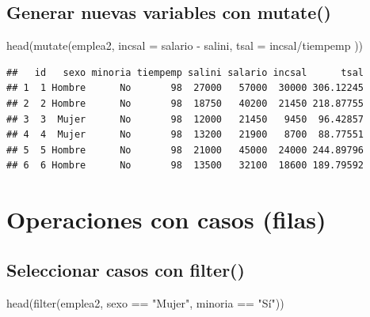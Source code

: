 \documentclass[
]{book}
\newenvironment{Shaded}{\begin{snugshade}}{\end{snugshade}}
\newcommand{\AttributeTok}[1]{\textcolor[rgb]{0.77,0.63,0.00}{#1}}
\newcommand{\FunctionTok}[1]{\textcolor[rgb]{0.00,0.00,0.00}{#1}}
\newcommand{\NormalTok}[1]{#1}
\newcommand{\SpecialCharTok}[1]{\textcolor[rgb]{0.00,0.00,0.00}{#1}}
\newcommand{\StringTok}[1]{\textcolor[rgb]{0.31,0.60,0.02}{#1}}
\theoremstyle{break}
\theoremstyle{nonumberplain}
\begin{document}
\hypertarget{generar-nuevas-variables-con-mutate}{%
\subsection{\texorpdfstring{Generar nuevas variables con \textbf{mutate()}}{Generar nuevas variables con mutate()}}\label{generar-nuevas-variables-con-mutate}}

\begin{Shaded}
\begin{Highlighting}[]
\FunctionTok{head}\NormalTok{(}\FunctionTok{mutate}\NormalTok{(emplea2, }\AttributeTok{incsal =}\NormalTok{ salario }\SpecialCharTok{{-}}\NormalTok{ salini, }\AttributeTok{tsal =}\NormalTok{ incsal}\SpecialCharTok{/}\NormalTok{tiempemp ))}
\end{Highlighting}
\end{Shaded}

\begin{verbatim}
##   id   sexo minoria tiempemp salini salario incsal      tsal
## 1  1 Hombre      No       98  27000   57000  30000 306.12245
## 2  2 Hombre      No       98  18750   40200  21450 218.87755
## 3  3  Mujer      No       98  12000   21450   9450  96.42857
## 4  4  Mujer      No       98  13200   21900   8700  88.77551
## 5  5 Hombre      No       98  21000   45000  24000 244.89796
## 6  6 Hombre      No       98  13500   32100  18600 189.79592
\end{verbatim}

\hypertarget{operaciones-con-casos-filas}{%
\section{Operaciones con casos (filas)}\label{operaciones-con-casos-filas}}

\hypertarget{seleccionar-casos-con-filter}{%
\subsection{\texorpdfstring{Seleccionar casos con \textbf{filter()}}{Seleccionar casos con filter()}}\label{seleccionar-casos-con-filter}}

\begin{Shaded}
\begin{Highlighting}[]
\FunctionTok{head}\NormalTok{(}\FunctionTok{filter}\NormalTok{(emplea2, sexo }\SpecialCharTok{==} \StringTok{"Mujer"}\NormalTok{, minoria }\SpecialCharTok{==} \StringTok{"Sí"}\NormalTok{))}
\end{Highlighting}
\end{Shaded}
\end{document}
